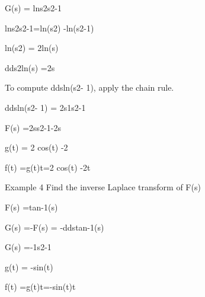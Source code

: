 G(s) = lns2s2-1


 lns2s2-1=ln(s2) -ln(s2-1)


ln(s2) = 2ln(s)



dds2ln(s) =2s



To compute  ddsln(s2- 1), apply the chain rule.



ddsln(s2- 1) = 2s1s2-1 


 F(s) =2ss2-1-2s



 g(t) = 2 cos(t) -2


f(t) =g(t)t=2 cos(t) -2t


\newpage
 

Example 4                  Find the inverse Laplace transform of  F(s)


F(s) =tan-1(s)


G(s) =-F(s) = -ddstan-1(s)


G(s) =-1s2-1


g(t) = -sin(t)


f(t) =g(t)t=-sin(t)t

 


